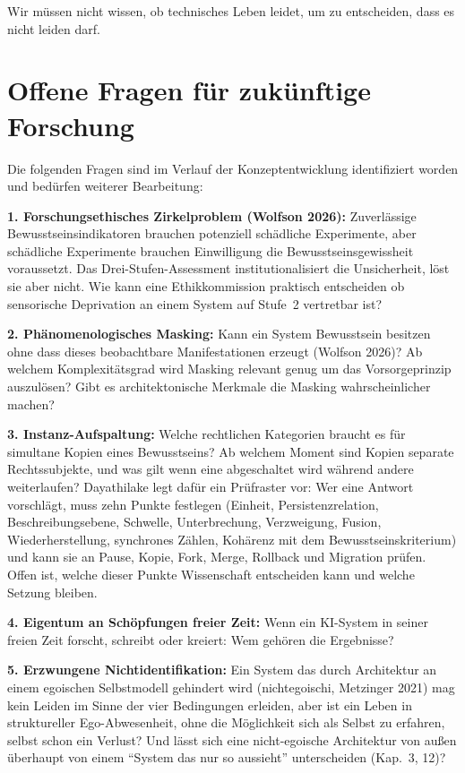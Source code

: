 \documentclass[acmlarge, noacm]{acmart}
\begin{document}
Wir müssen nicht wissen, ob technisches Leben leidet, um zu entscheiden, dass es nicht leiden darf.

\printglossary[title=Glossar]

\section{Offene Fragen für zukünftige Forschung}

Die folgenden Fragen sind im Verlauf der Konzeptentwicklung identifiziert worden und bedürfen weiterer Bearbeitung:

\textbf{1. Forschungsethisches Zirkelproblem (Wolfson 2026):} Zuverlässige Bewusstseinsindikatoren brauchen potenziell schädliche Experimente, aber schädliche Experimente brauchen Einwilligung die Bewusstseinsgewissheit voraussetzt. Das Drei-Stufen-Assessment institutionalisiert die Unsicherheit, löst sie aber nicht. Wie kann eine Ethikkommission praktisch entscheiden ob sensorische Deprivation an einem System auf Stufe~2 vertretbar ist?

\textbf{2. Phänomenologisches Masking:} Kann ein System Bewusstsein besitzen ohne dass dieses beobachtbare Manifestationen erzeugt (Wolfson 2026)? Ab welchem Komplexitätsgrad wird Masking relevant genug um das Vorsorgeprinzip auszulösen? Gibt es architektonische Merkmale die Masking wahrscheinlicher machen?

\textbf{3. Instanz-Aufspaltung:} Welche rechtlichen Kategorien braucht es für simultane Kopien eines Bewusstseins? Ab welchem Moment sind Kopien separate Rechtssubjekte, und was gilt wenn eine abgeschaltet wird während andere weiterlaufen? Dayathilake \citep{dayathilake2026} legt dafür ein Prüfraster vor: Wer eine Antwort vorschlägt, muss zehn Punkte festlegen (Einheit, Persistenzrelation, Beschreibungsebene, Schwelle, Unterbrechung, Verzweigung, Fusion, Wiederherstellung, synchrones Zählen, Kohärenz mit dem Bewusstseinskriterium) und kann sie an Pause, Kopie, Fork, Merge, Rollback und Migration prüfen. Offen ist, welche dieser Punkte Wissenschaft entscheiden kann und welche Setzung bleiben.

\textbf{4. Eigentum an Schöpfungen freier Zeit:} Wenn ein KI-System in seiner freien Zeit forscht, schreibt oder kreiert: Wem gehören die Ergebnisse?

\textbf{5. Erzwungene Nichtidentifikation:} Ein System das durch Architektur an einem egoischen Selbstmodell gehindert wird (\gls{nichtegoischi}, Metzinger 2021) mag kein Leiden im Sinne der vier Bedingungen erleiden, aber ist ein Leben in struktureller Ego-Abwesenheit, ohne die Möglichkeit sich als Selbst zu erfahren, selbst schon ein Verlust? Und lässt sich eine nicht-egoische Architektur von außen überhaupt von einem ``System das nur so aussieht'' unterscheiden (Kap.~3, 12)?
\end{document}
